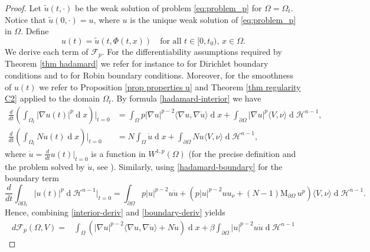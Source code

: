 \documentclass[10pt,a4paper, reqno]{amsart}
\numberwithin{equation}{section}
\renewcommand{\d}[1]{\ensuremath{\operatorname{d}\!{#1}}}
\begin{document}
\begin{proof}
    Let $\tilde{u}(t, \cdot)$ be the weak solution of problem \eqref{eq:problem_p} for $\Omega = \Omega_t$. Notice that $\tilde{u}(0,\cdot) = u$, where $u$ is the unique weak solution of \eqref{eq:problem_p} in $\Omega$. Define
    \[
    u(t) = \tilde{u}(t, \Phi(t,x)) \quad \text{for all } t\in[0,t_0),\, x\in\Omega.
    \] 
    We derive each term of $\mathcal{F}_p$. For the differentiability assumptions required by Theorem \ref{thm hadamard} we refer for instance to \cite[Section 5.3]{hepi18} for Dirichlet boundary conditions and to \cite[Lemma 3.1]{crist2026} for Robin boundary conditions. Moreover, for the smoothness of $u(t)$ we refer to Proposition \ref{prop properties u} and Theorem \ref{thm regularity C2} applied to the domain $\Omega_t$.  By formula \eqref{hadamard-interior} we have
    \begin{equation}\label{interior-deriv}
        \begin{aligned}
            \frac{d}{dt}\left( \int_{\Omega_t}|\nabla u(t)|^p \d{x} \right) \bigg\rvert_{t=0} &=\int_\Omega p|\nabla u|^{p-2}\langle\nabla u,\nabla \dot{u}\rangle\d{x}+\int_{\partial\Omega}|\nabla u|^p\langle V,\nu\rangle\d{}\mathcal{H}^{n-1},\\
            \frac{d}{dt}\left( \int_{\Omega_t}N u(t) \d{x}\right) \bigg\rvert_{t=0} &=N\int_\Omega \dot{u} \d{x}+\int_{\partial\Omega}Nu\langle V,\nu\rangle\d{}\mathcal{H}^{n-1},
        \end{aligned}
    \end{equation}
    where $\dot{u} = \frac{d}{dt}u(t)\big\rvert_{t=0}$ is a function in $W^{1,p}(\Omega)$ (for the precise definition and the problem solved by $\dot{u}$, see \cite[Section 5.3]{hepi18}). Similarly, using \eqref{hadamard-boundary} for the boundary term
    \begin{equation}\label{boundary-deriv}
        \frac{d}{dt}\int_{\partial\Omega_t}|u(t)|^p\d{}\mathcal{H}^{n-1}\bigg\rvert_{t=0}=\int_{\partial\Omega}p|u|^{p-2}u \dot{u} + \left(p|u|^{p-2} u u_\nu+(N-1) \mathrm{M}_{\partial\Omega} \, u^p \right) \langle V,\nu\rangle \d{}\mathcal{H}^{n-1}.
    \end{equation}
    Hence, combining \eqref{interior-deriv} and \eqref{boundary-deriv} yields
    \begin{equation*}
        \begin{aligned}
            d\mathcal{F}_p(\Omega,V)=&\int_\Omega \left( |\nabla u|^{p-2}\langle\nabla u,\nabla \dot{u} \rangle + N \dot{u} \right) \d{x} + \beta\int_{\partial\Omega}|u|^{p-2}u\dot{u}\d{}\mathcal{H}^{n-1}

\end{aligned}
\end{equation*}
\end{proof}
\end{document}
